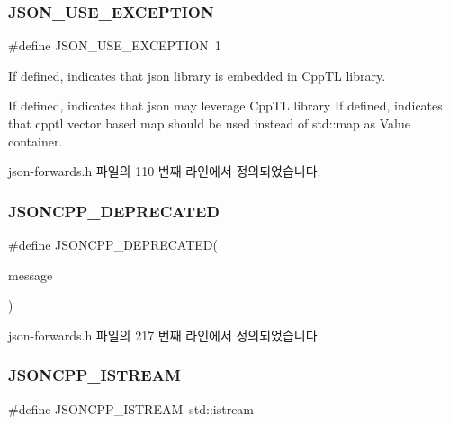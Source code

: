 \subsubsection{\texorpdfstring{J\+S\+O\+N\+\_\+\+U\+S\+E\+\_\+\+E\+X\+C\+E\+P\+T\+I\+ON}{JSON\_USE\_EXCEPTION}}
{\footnotesize\ttfamily \#define J\+S\+O\+N\+\_\+\+U\+S\+E\+\_\+\+E\+X\+C\+E\+P\+T\+I\+ON~1}



If defined, indicates that json library is embedded in Cpp\+TL library. 

If defined, indicates that json may leverage Cpp\+TL library If defined, indicates that cpptl vector based map should be used instead of std\+::map as Value container. 

json-\/forwards.\+h 파일의 110 번째 라인에서 정의되었습니다.

\mbox{\label{json-forwards_8h_a6933a4321aa03c8a29016669073f1af6}} 
\subsubsection{\texorpdfstring{J\+S\+O\+N\+C\+P\+P\+\_\+\+D\+E\+P\+R\+E\+C\+A\+T\+ED}{JSONCPP\_DEPRECATED}}
{\footnotesize\ttfamily \#define J\+S\+O\+N\+C\+P\+P\+\_\+\+D\+E\+P\+R\+E\+C\+A\+T\+ED(\begin{DoxyParamCaption}\item[{}]{message }\end{DoxyParamCaption})}



json-\/forwards.\+h 파일의 217 번째 라인에서 정의되었습니다.

\mbox{\label{json-forwards_8h_a15f2f70b2ce0a2abd0f8112393dbc4de}} 
\subsubsection{\texorpdfstring{J\+S\+O\+N\+C\+P\+P\+\_\+\+I\+S\+T\+R\+E\+AM}{JSONCPP\_ISTREAM}}
{\footnotesize\ttfamily \#define J\+S\+O\+N\+C\+P\+P\+\_\+\+I\+S\+T\+R\+E\+AM~std\+::istream}



